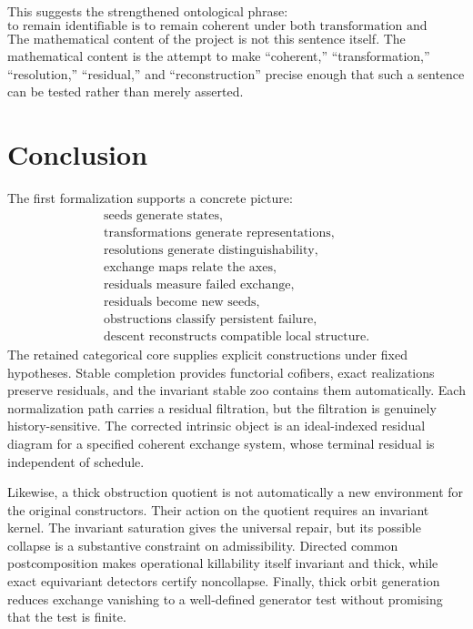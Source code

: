 \documentclass[11pt]{article}
\theoremstyle{definition}
\theoremstyle{remark}
\begin{document}
This suggests the strengthened ontological phrase:
\[
\boxed{
\text{to remain identifiable is to remain coherent under both transformation and resolution.}
}
\]
The mathematical content of the project is not this sentence itself. The mathematical content is the attempt to make ``coherent,'' ``transformation,'' ``resolution,'' ``residual,'' and ``reconstruction'' precise enough that such a sentence can be tested rather than merely asserted.

\section{Conclusion}

The first formalization supports a concrete picture:
\[
\boxed{
\begin{array}{c}
\text{seeds generate states},\\
\text{transformations generate representations},\\
\text{resolutions generate distinguishability},\\
\text{exchange maps relate the axes},\\
\text{residuals measure failed exchange},\\
\text{residuals become new seeds},\\
\text{obstructions classify persistent failure},\\
\text{descent reconstructs compatible local structure}.
\end{array}
}
\]
The retained categorical core supplies explicit constructions under fixed hypotheses. Stable completion provides functorial cofibers, exact realizations preserve residuals, and the invariant stable zoo contains them automatically. Each normalization path carries a residual filtration, but the filtration is genuinely history-sensitive. The corrected intrinsic object is an ideal-indexed residual diagram for a specified coherent exchange system, whose terminal residual is independent of schedule.

Likewise, a thick obstruction quotient is not automatically a new environment for the original constructors. Their action on the quotient requires an invariant kernel. The invariant saturation gives the universal repair, but its possible collapse is a substantive constraint on admissibility. Directed common postcomposition makes operational killability itself invariant and thick, while exact equivariant detectors certify noncollapse. Finally, thick orbit generation reduces exchange vanishing to a well-defined generator test without promising that the test is finite.
\end{document}
